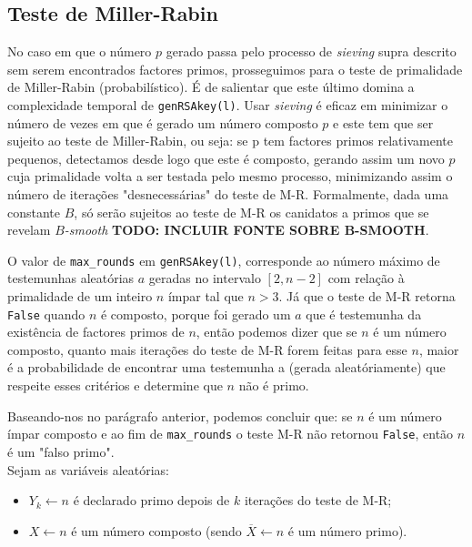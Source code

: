 \documentclass[dvipsnames]{article}
\begin{document}
\subsection{Teste de Miller-Rabin}

No caso em que o número $p$ gerado passa pelo processo de \textit{sieving} supra descrito sem serem encontrados factores primos, prosseguimos para o teste de primalidade de Miller-Rabin (probabilístico). É de salientar que este último domina a complexidade temporal de \texttt{genRSAkey(l)}. Usar \textit{sieving} é eficaz em minimizar o número de vezes em que é gerado um número composto $p$ e este tem que ser sujeito ao teste de Miller-Rabin, ou seja: se p tem factores primos relativamente pequenos, detectamos desde logo que este é composto, gerando assim um novo $p$ cuja primalidade volta a ser testada pelo mesmo processo, minimizando assim o número de iterações "desnecessárias" do teste de M-R. Formalmente, dada uma constante $B$, só serão sujeitos ao teste de M-R os canidatos a primos que se revelam $B$\textit{-smooth} \textbf{TODO: INCLUIR FONTE SOBRE B-SMOOTH}.

\vskip 0.4cm

\noindent O valor de \texttt{max\_rounds} em \texttt{genRSAkey(l)}, corresponde ao número máximo de testemunhas aleatórias $a$ geradas no intervalo $[2,n-2]$ com relação à primalidade de um inteiro $n$ ímpar tal que $n>3$. Já que o teste de M-R retorna \texttt{False} quando $n$ é composto, porque foi gerado um $a$ que é testemunha da existência de factores primos de $n$, então podemos dizer que se $n$ é um número composto, quanto mais iterações do teste de M-R forem feitas para esse $n$, maior é a probabilidade de encontrar uma testemunha a (gerada aleatóriamente) que respeite esses critérios e determine que $n$ não é primo.

\vskip 0.4cm

\noindent Baseando-nos no parágrafo anterior, podemos concluir que: se $n$ é um número ímpar composto e ao fim de \texttt{max\_rounds} o teste M-R não retornou \texttt{False}, então $n$ é um "falso primo".\\

\noindent Sejam as variáveis aleatórias:

\begin{itemize}
  \item $Y_k \leftarrow n$ é declarado primo depois de $k$ iterações do teste de M-R;
  \item $X \leftarrow n$ é um número composto (sendo $\overline{X} \leftarrow n$ é um número primo).
\end{itemize}
\end{document}
